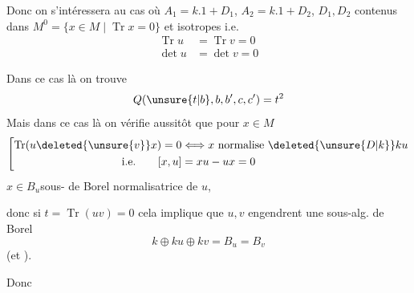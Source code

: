 Donc on s'intéressera  au cas où $A_1=k.1+D_1$, $A_2=k.1+D_2$, $D_1,D_2$ contenus dans $M^0=\{x\in M\mid\operatorname{Tr}x=0\}$ et isotropes i.e.
\[
\begin{aligned}
\operatorname{Tr}u&=\operatorname{Tr}v=0\\
\det u&=\det v=0
\end{aligned}
\]

Dans ce cas là on trouve
\[
Q(\unsure{t|b},b,b',c,c')=t^2
\]
Mais dans ce cas là on vérifie aussitôt que pour $x\in M$
\[
\left[\begin{aligned}
\operatorname{Tr}(u\deleted{\unsure{v}}x)=0&\Longleftrightarrow x\text{ normalise }\deleted{\unsure{D|k}}ku\\
\text{i.e.}\qquad [x,u]&=xu-ux=0
\end{aligned}\right.
\]
  $x\in B_u$\quad sous- de Borel normalisatrice de $u$,

donc si $t=\operatorname{Tr}(uv)=0$ cela implique que $u,v$ engendrent  une sous-alg. de Borel
\[
k\oplus ku\oplus kv=B_u=B_v
\]
(et ).

Donc
